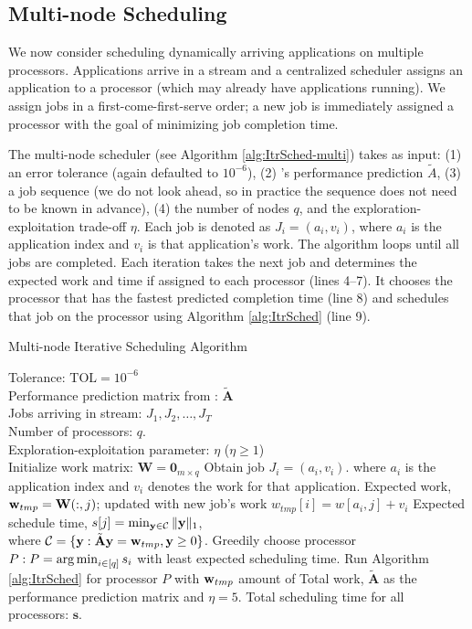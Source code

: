 \subsection{Multi-node Scheduling}
\label{sec:schedule_multi}
We now consider scheduling dynamically arriving applications on
multiple processors. Applications arrive in a stream and a centralized
scheduler assigns an application to a processor (which may already
have applications running). We assign jobs in a first-come-first-serve
order; a new job is immediately assigned a processor with the goal of
minimizing job completion time. 

The multi-node scheduler (see Algorithm \ref{alg:ItrSched-multi})
takes as input: (1) an error tolerance (again defaulted to $10^{-6}$),
(2) \SYSTEM{}'s performance prediction $\tilde{A}$, (3) a job sequence
(we do not look ahead, so in practice the sequence does not need to be
known in advance), (4) the number of nodes $q$, and the
exploration-exploitation trade-off $\eta$.  Each job is denoted as
$J_i = (a_i,v_i)$, where $a_i$ is the application index and $v_i$ is
that application's work.  The algorithm loops until all jobs are
completed.  Each iteration takes the next job and determines the
expected work and time if assigned to each processor (lines 4--7).
It chooses the processor that has the fastest predicted completion
time (line 8) and schedules that job on the processor using Algorithm
\ref{alg:ItrSched} (line 9).
 
\begin{algorithm}[!t]
\caption{Multi-node Iterative Scheduling Algorithm}
\begin{algorithmic}[1]
\small
\REQUIRE Tolerance: $\text{TOL} = 10^{-6}$\\ 
Performance prediction matrix from \SYSTEM{}: $\tilde{\mathbf{A}}$ \\
Jobs arriving in stream: $J_1, J_2, \ldots, J_T $ \\
Number of processors: $q$. \\
Exploration-exploitation parameter: $\eta$ ($\eta \geq 1$) \\ 
\STATE Initialize work matrix: $\mathbf{W} = \mathbf{0}_{m \times q}$ 
\STATE Obtain job $J_i = (a_i, v_i)$. where $a_i$ is the application index and $v_i$ denotes the work for that application.
\STATE Expected work, $\mathbf{w}_{tmp} = \mathbf{W}(:,j)$; updated with new job's work $w_{tmp}[i] = w[a_i,j] + v_i$
\STATE Expected schedule time, $s[j] = \min_{\mathbf{y} \in \mathcal{C}} \|\mathbf{y}\|_1 $, \\where $ \mathcal{C} = \{ \mathbf{y}: \tilde{\mathbf{A}} \mathbf{y} = \mathbf{w}_{tmp} ,\mathbf{y} \geq 0 \}$.
\ENDFOR
\STATE Greedily choose processor $P: P = \operatorname*{arg\,min}_{i\in [q]} s_i$ with least expected scheduling time.
\STATE Run Algorithm \ref{alg:ItrSched} for processor $P$ with $\mathbf{w}_{tmp}$ amount of Total work, $\tilde{\mathbf{A}}$ as the performance prediction matrix and $\eta = 5$.
\ENDFOR 
\RETURN Total scheduling time for all processors: $\mathbf{s}$.
\end{algorithmic}
\label{alg:ItrSched-multi}
\end{algorithm}